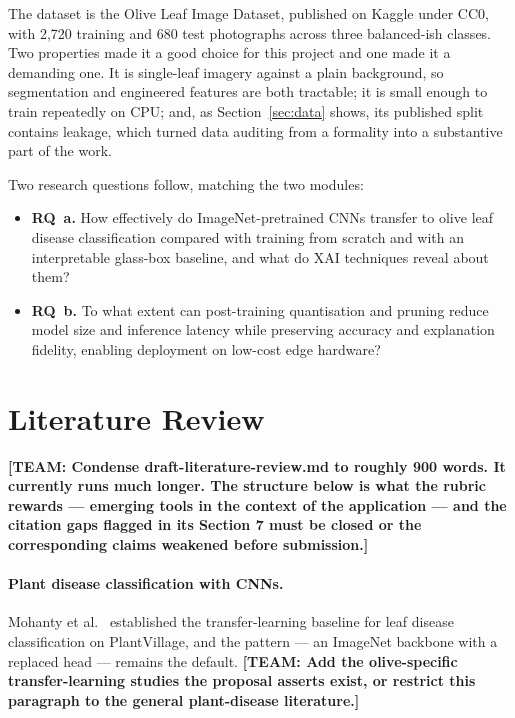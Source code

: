 \documentclass[sigconf,nonacm]{acmart}
\newcommand{\NEEDSTEAM}[1]{\textbf{[TEAM: #1]}}
\begin{document}
The dataset is the Olive Leaf Image Dataset, published on Kaggle under CC0, with
2{,}720 training and 680 test photographs across three balanced-ish classes. Two
properties made it a good choice for this project and one made it a demanding
one. It is single-leaf imagery against a plain background, so segmentation and
engineered features are both tractable; it is small enough to train repeatedly on
CPU; and, as Section~\ref{sec:data} shows, its published split contains leakage,
which turned data auditing from a formality into a substantive part of the work.

Two research questions follow, matching the two modules:

\begin{itemize}
\item \textbf{RQ~a.} How effectively do ImageNet-pretrained CNNs transfer to
  olive leaf disease classification compared with training from scratch and with
  an interpretable glass-box baseline, and what do XAI techniques reveal about
  them?
\item \textbf{RQ~b.} To what extent can post-training quantisation and pruning
  reduce model size and inference latency while preserving accuracy and
  explanation fidelity, enabling deployment on low-cost edge hardware?
\end{itemize}

\section{Literature Review}

\NEEDSTEAM{Condense draft-literature-review.md to roughly 900 words. It currently
runs much longer. The structure below is what the rubric rewards --- emerging
tools in the context of the application --- and the citation gaps flagged in its
Section 7 must be closed or the corresponding claims weakened before submission.}

\paragraph{Plant disease classification with CNNs.}
Mohanty et al.~\cite{mohanty2016} established the transfer-learning baseline for
leaf disease classification on PlantVillage, and the pattern --- an ImageNet
backbone with a replaced head --- remains the default. \NEEDSTEAM{Add the
olive-specific transfer-learning studies the proposal asserts exist, or restrict
this paragraph to the general plant-disease literature.}
\end{document}
